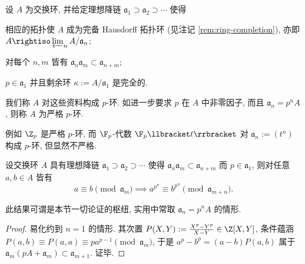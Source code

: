 \begin{definition}\label{def:p-ring} 
	设 $A$ 为交换环, 并给定理想降链 $\mathfrak{a}_1 \supset \mathfrak{a}_2 \supset \cdots$ 使得
	\begin{compactitem}
		\item 相应的拓扑使 $A$ 成为完备 Hausdorff 拓扑环 (见注记 \ref{rem:ring-completion}), 亦即 $A \rightiso \varprojlim_n A/\mathfrak{a}_n$;
		\item 对每个 $n, m$ 皆有 $\mathfrak{a}_n \mathfrak{a}_m \subset \mathfrak{a}_{n+m}$;
		\item $p \in \mathfrak{a}_1$ 并且剩余环 $\kappa := A/\mathfrak{a}_1$ 是完全的.
	\end{compactitem}
	我们称 $A$ 对这些资料构成 $p$-环. 如进一步要求 $p$ 在 $A$ 中非零因子, 而且 $\mathfrak{a}_n = p^n A$, 则称 $A$ 为严格 $p$-环.
\end{definition}
例如 $\Z_p$ 是严格 $p$-环, 而 $\F_p$-代数 $\F_p \llbracket t \rrbracket$ 对 $\mathfrak{a}_n := (t^n)$ 构成 $p$-环, 但显然不严格.

\begin{lemma}\label{prop:aux-p-power}
	设交换环 $A$ 具有理想降链 $\mathfrak{a}_1 \supset \mathfrak{a}_2 \supset \cdots$ 使得 $\mathfrak{a}_n \mathfrak{a}_m \subset \mathfrak{a}_{n+m}$ 而 $p \in \mathfrak{a}_1$, 则对任意 $a,b \in A$ 皆有
	\[ a \equiv b \pmod{\mathfrak{a}_m} \implies a^{p^n} \equiv b^{p^n} \pmod{\mathfrak{a}_{m+n}}. \]
\end{lemma}
此结果可谓是本节一切论证的枢纽, 实用中常取 $\mathfrak{a}_n = p^n A$ 的情形.
\begin{proof}
	易化约到 $n=1$ 的情形. 其次置 $P(X,Y) := \frac{X^p-Y^p}{X-Y} \in \Z[X,Y]$, 条件蕴涵 $P(a,b) \equiv P(a,a) \equiv pa^{p-1} \pmod{\mathfrak{a}_m}$, 于是 $a^p - b^p = (a-b) P(a,b)$ 属于 $\mathfrak{a}_m (pA + \mathfrak{a}_m) \subset \mathfrak{a}_{m+1}$. 证毕.
\end{proof}

